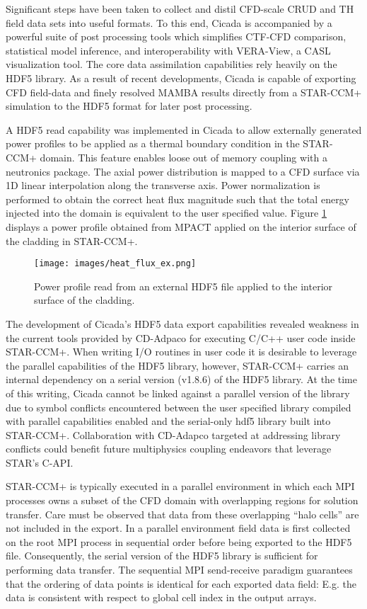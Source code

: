 Significant steps have been taken to collect and distil CFD-scale CRUD and TH field data sets into useful formats.  To this end, Cicada is accompanied by a powerful suite of post processing tools which simplifies CTF-CFD comparison, statistical model inference, and interoperability with VERA-View, a CASL visualization tool. The core data assimilation capabilities rely heavily on the HDF5 library.  As a result of recent developments, Cicada is capable of exporting CFD field-data and finely resolved MAMBA results directly from a STAR-CCM+ simulation to the HDF5 format for later post processing.  

A HDF5 read capability was implemented in Cicada to allow externally generated power profiles to be applied as a thermal boundary condition in the STAR-CCM+ domain.  This feature enables loose out of memory coupling with a neutronics package. 
The axial power distribution is mapped to a CFD surface via 1D linear interpolation along the transverse axis.  Power normalization is performed to obtain the correct heat flux magnitude such that the total energy injected into the domain is equivalent to the user specified value.   Figure \ref{fig:heat_flux_ex} displays a power profile obtained from MPACT applied on the interior surface of the cladding in STAR-CCM+.

\begin{figure}[hbtp]
\centering
\texttt{[image: images/heat\_flux\_ex.png]}
\caption{Power profile read from an external HDF5 file applied to the interior surface of the cladding.}
\label{fig:heat_flux_ex}
\end{figure}

The development of Cicada's HDF5 data export capabilities revealed weakness in the current tools provided by CD-Adpaco for executing C/C++ user code inside STAR-CCM+.  When writing I/O routines in user code it is desirable to leverage the parallel capabilities of the HDF5 library, however, STAR-CCM+ carries an internal dependency on a serial version (v1.8.6) of the HDF5 library.  At the time of this writing, Cicada cannot be linked against a parallel version of the library due to symbol conflicts encountered between the user specified library compiled with parallel capabilities enabled and the serial-only hdf5 library built into STAR-CCM+.
Collaboration with CD-Adapco targeted at addressing library conflicts could benefit future multiphysics coupling endeavors that leverage STAR's C-API.

STAR-CCM+ is typically executed in a parallel environment in which each MPI processes owns a subset of the CFD domain with overlapping regions for solution transfer.  Care must be observed that data from these overlapping ``halo cells'' are not included in the export.  In a parallel environment field data is first collected on the root MPI process in sequential order before being exported to the HDF5 file.  Consequently, the serial version of the HDF5 library is sufficient for performing data transfer.  The sequential MPI send-receive paradigm guarantees that the ordering of data points is identical for each exported data field: E.g. the data is consistent with respect to global cell index in the output arrays.   

